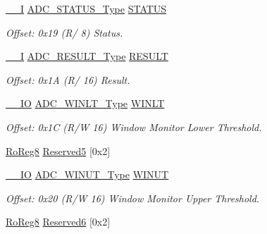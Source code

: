 \begin{DoxyCompactItemize}
\mbox{\hyperlink{core__cm0plus_8h_af63697ed9952cc71e1225efe205f6cd3}{\+\_\+\+\_\+I}} \mbox{\hyperlink{union_a_d_c___s_t_a_t_u_s___type}{A\+D\+C\+\_\+\+S\+T\+A\+T\+U\+S\+\_\+\+Type}} \mbox{\hyperlink{struct_adc_a15371d20a1b387f8cb2dae8a5b9c855f}{S\+T\+A\+T\+US}}
\begin{DoxyCompactList}\small\item\em Offset\+: 0x19 (R/ 8) Status. \end{DoxyCompactList}\item 
\mbox{\hyperlink{core__cm0plus_8h_af63697ed9952cc71e1225efe205f6cd3}{\+\_\+\+\_\+I}} \mbox{\hyperlink{union_a_d_c___r_e_s_u_l_t___type}{A\+D\+C\+\_\+\+R\+E\+S\+U\+L\+T\+\_\+\+Type}} \mbox{\hyperlink{struct_adc_a5b0f41ddaff9a0db96bbe1cc0a16231e}{R\+E\+S\+U\+LT}}
\begin{DoxyCompactList}\small\item\em Offset\+: 0x1A (R/ 16) Result. \end{DoxyCompactList}\item 
\mbox{\hyperlink{core__cm0plus_8h_aec43007d9998a0a0e01faede4133d6be}{\+\_\+\+\_\+\+IO}} \mbox{\hyperlink{union_a_d_c___w_i_n_l_t___type}{A\+D\+C\+\_\+\+W\+I\+N\+L\+T\+\_\+\+Type}} \mbox{\hyperlink{struct_adc_a16b5ee670a97f4f8135b6a55ef4751b8}{W\+I\+N\+LT}}
\begin{DoxyCompactList}\small\item\em Offset\+: 0x1C (R/W 16) Window Monitor Lower Threshold. \end{DoxyCompactList}\item 
\mbox{\hyperlink{group___s_a_m_d21_e15_a__definitions_ga0d957f1433aaf5d70e4dc2b68288442d}{Ro\+Reg8}} \mbox{\hyperlink{struct_adc_a5771b852409b146285e223c4265972b8}{Reserved5}} \mbox{[}0x2\mbox{]}
\item 
\mbox{\hyperlink{core__cm0plus_8h_aec43007d9998a0a0e01faede4133d6be}{\+\_\+\+\_\+\+IO}} \mbox{\hyperlink{union_a_d_c___w_i_n_u_t___type}{A\+D\+C\+\_\+\+W\+I\+N\+U\+T\+\_\+\+Type}} \mbox{\hyperlink{struct_adc_affcbbe1dfc4b55c5d6025e051a750fc2}{W\+I\+N\+UT}}
\begin{DoxyCompactList}\small\item\em Offset\+: 0x20 (R/W 16) Window Monitor Upper Threshold. \end{DoxyCompactList}\item 
\mbox{\hyperlink{group___s_a_m_d21_e15_a__definitions_ga0d957f1433aaf5d70e4dc2b68288442d}{Ro\+Reg8}} \mbox{\hyperlink{struct_adc_a8e9dcdbe22cc3e20d4b45b25938767e2}{Reserved6}} \mbox{[}0x2\mbox{]}
\item 

\end{DoxyCompactItemize}
